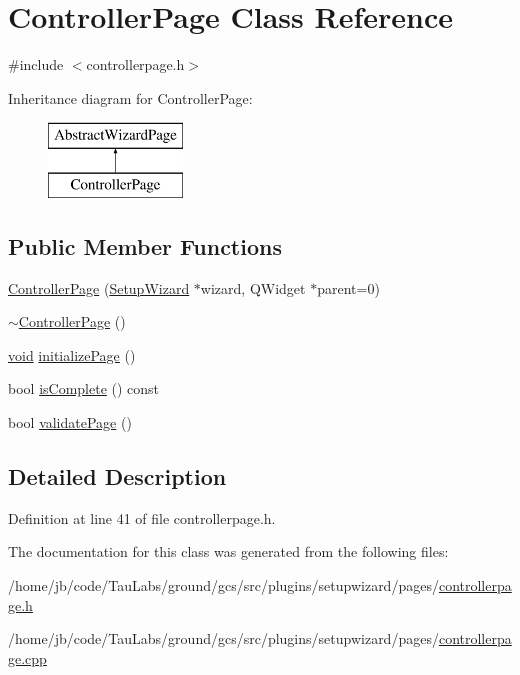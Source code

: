 \hypertarget{class_controller_page}{\section{\-Controller\-Page \-Class \-Reference}
\label{class_controller_page}
}


{\ttfamily \#include $<$controllerpage.\-h$>$}

\-Inheritance diagram for \-Controller\-Page\-:\begin{figure}[H]
\begin{center}
\leavevmode
\includegraphics[height=2.000000cm]{class_controller_page}
\end{center}
\end{figure}
\subsection*{\-Public \-Member \-Functions}
\begin{DoxyCompactItemize}
\item 
\hyperlink{group___controller_page_ga82de0473ed3c57a5a89736525b0336f2}{\-Controller\-Page} (\hyperlink{class_setup_wizard}{\-Setup\-Wizard} $\ast$wizard, \-Q\-Widget $\ast$parent=0)
\item 
\hyperlink{group___controller_page_ga5573a5d2568f7e15528658e32de887d3}{$\sim$\-Controller\-Page} ()
\item 
\hyperlink{group___u_a_v_objects_plugin_ga444cf2ff3f0ecbe028adce838d373f5c}{void} \hyperlink{group___controller_page_gaf9c2ad04637cf0961bd7bb5d5d5200c4}{initialize\-Page} ()
\item 
bool \hyperlink{group___controller_page_gae5ede361df9cdf86bf53ce39ef72267c}{is\-Complete} () const 
\item 
bool \hyperlink{group___controller_page_ga91bcb88db666a8d5585553520d1247b9}{validate\-Page} ()
\end{DoxyCompactItemize}


\subsection{\-Detailed \-Description}


\-Definition at line 41 of file controllerpage.\-h.



\-The documentation for this class was generated from the following files\-:\begin{DoxyCompactItemize}
\item 
/home/jb/code/\-Tau\-Labs/ground/gcs/src/plugins/setupwizard/pages/\hyperlink{controllerpage_8h}{controllerpage.\-h}\item 
/home/jb/code/\-Tau\-Labs/ground/gcs/src/plugins/setupwizard/pages/\hyperlink{controllerpage_8cpp}{controllerpage.\-cpp}\end{DoxyCompactItemize}

